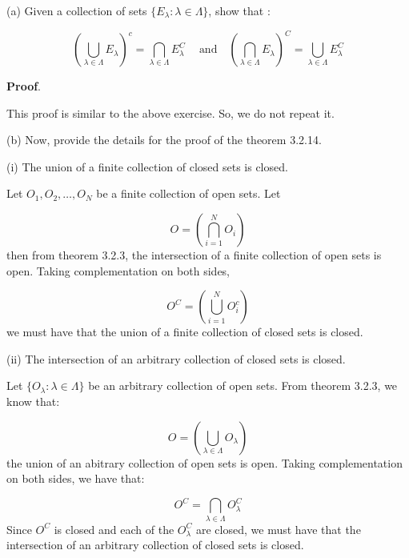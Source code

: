 \documentclass[10pt]{article}
\begin{document}
(a) Given a collection of sets $\displaystyle \{E_{\lambda } :\lambda \in \Lambda \}$, show that :


\begin{equation*}
\left(\bigcup _{\lambda \in \Lambda } E_{\lambda }\right)^{c} =\bigcap _{\lambda \in \Lambda } E_{\lambda }^{C} \ \quad \text{and} \quad \left(\bigcap _{\lambda \in \Lambda } E_{\lambda }\right)^{C} =\bigcup _{\lambda \in \Lambda } E_{\lambda }^{C}
\end{equation*}


\textbf{Proof}.



This proof is similar to the above exercise. So, we do not repeat it.



(b) Now, provide the details for the proof of the theorem 3.2.14.



(i) The union of a finite collection of closed sets is closed.



Let $\displaystyle O_{1} ,O_{2} ,\dotsc ,O_{N}$ be a finite collection of open sets. Let 


\begin{equation*}
O=\left(\bigcap _{i=1}^{N} O_{i}\right)
\end{equation*}
then from theorem 3.2.3, the intersection of a finite collection of open sets is open. Taking complementation on both sides,


\begin{equation*}
O^{C} =\left(\bigcup _{i=1}^{N} O_{i}^{c}\right)
\end{equation*}
we must have that the union of a finite collection of closed sets is closed.



(ii) The intersection of an arbitrary collection of closed sets is closed.



Let $\displaystyle \{O_{\lambda } :\lambda \in \Lambda \}$ be an arbitrary collection of open sets. From theorem 3.2.3, we know that:


\begin{equation*}
O=\left(\bigcup _{\lambda \in \Lambda } O_{\lambda }\right)
\end{equation*}
the union of an abitrary collection of open sets is open. Taking complementation on both sides, we have that:


\begin{equation*}
O^{C} =\bigcap _{\lambda \in \Lambda } O_{\lambda }^{C}
\end{equation*}
Since $\displaystyle O^{C}$ is closed and each of the $\displaystyle O_{\lambda }^{C}$ are closed, we must have that the intersection of an arbitrary collection of closed sets is closed.
\end{document}
